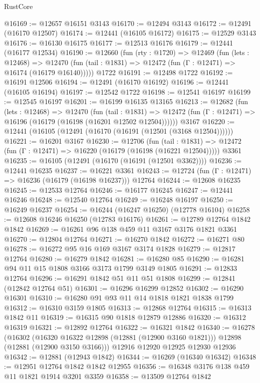 \begin{lexlean}{RustCore}
\begin{coremodule}
@16169 := @12657 @16151 @3143
@16170 := @12494 @3143
@16172 := @12491 (@16170 @12507)
@16174 := @12441 (@16105 @16172)
@16175 := @12529 @3143
@16176 := @16130 @16175
@16177 := @12513 @16176
@16179 := @12441 (@16177 @12534)
@16190 := @12660
    (fun (rty : @1720) =>
    @12469
      (fun (lets : @12468) =>
      @12470 (fun (tail : @1831) => @12472 (fun (Γ : @12471) => @16174 (@16179 @16140)))))
    @1722
@16191 := @12498 @1722
@16192 := @16191 @12506
@16194 := @12491 (@16170 @16192)
@16196 := @12441 (@16105 @16194)
@16197 := @12542 @1722
@16198 := @12541 @16197
@16199 := @12545 @16197
@16201 := @16199 @16135 @13165
@16213 := @12682
    (fun (lets : @12468) =>
    @12470
      (fun (tail : @1831) =>
      @12472 (fun (Γ : @12471) => @16196 (@16179 (@16198 (@16201 @12502 @12504))))))
    @3167
@16220 := @12441 (@16105 (@12491 (@16170 (@16191 (@12501 (@3168 @12504))))))
@16221 := @16201 @3167
@16230 := @12706
    (fun (tail : @1831) => @12472 (fun (Γ : @12471) => @16220 (@16179 (@16198 (@16221 @12504)))))
    @3361
@16235 := @16105 (@12491 (@16170 (@16191 (@12501 @3362))))
@16236 := @12441 @16235
@16237 := @16221 @3361
@16243 := @12724 (fun (Γ : @12471) => @16236 (@16179 (@16198 @16237))) @12764
@16244 := @12608 @16235
@16245 := @12533 @12764
@16246 := @16177 @16245
@16247 := @12441 @16246
@16248 := @12540 @12764
@16249 := @16248 @16197
@16250 := @16249 @16237
@16254 := @16244 (@16247 @16250) (@12778 @16104)
@16258 := @12608 @16246 @16250 (@12783 @16176)
@16261 := @12789 @12764 @1842 @1842
@16269 := @16261 @96 @138 @459 @11 @3167 @3176 @1821 @3361
@16270 := @12804 @12764
@16271 := @16270 @1842
@16272 := @16271 @80
@16278 := @16272 @95 @16 @169 @3167 @3174 @1828
@16279 := @12817 @12764
@16280 := @16279 @1842
@16281 := @16280 @85
@16290 := @16281 @94 @11 @15 @1808 @3166 @3173 @1799 @3149 @1805
@16291 := @12833 @12764
@16296 := @16291 @1842 @51 @11 @51 @1808
@16299 := @12841 (@12842 @12764 @51)
@16301 := @16296 @16299 @12852
@16302 := @16290 @16301
@16310 := @16280 @91 @93 @11 @14 @1818 @1821 @1838 @1799
@16312 := @16310 @3159 @1805
@16313 := @12868 @12764
@16315 := @16313 @1842 @11
@16319 := @16315 @90 @1818 @12879 @12886
@16320 := @16312 @16319
@16321 := @12892 @12764
@16322 := @16321 @1842
@16340 := @16278
    (@16302
      (@16320 @16322 @12898 (@12881 (@12900 @3160 @1821)))
      @12898
      (@12881 (@12900 @3150 @3166)))
    @12916
    @12920
    @12925
    @12930
    @12936
@16342 := @12881 (@12943 @1842)
@16344 := @16269 (@16340 @16342)
@16348 := @12951 @12764 @1842 @1842 @12955
@16356 := @16348 @3176 @138 @459 @11 @1821 @1914 @3201 @3359
@16358 := @13509 @12764 @1842

\end{coremodule}
\end{lexlean}
